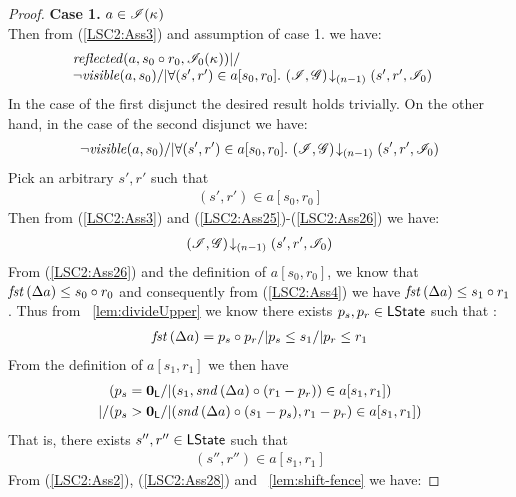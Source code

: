 \begin{lemma}
\begin{proof}
\noindent\textbf{Case 1. } $a \in \mathscr{I}(\kappa_{})$\\
Then from (\ref{LSC2:Ass3}) and assumption of case 1. we have:
%
\begin{align*}
&\begin{array}{l}
	\mathit{reflected}(a, s_0 \circ r_0, \mathscr{I}_0(\kappa_{})) |/ \\
	\neg\mathit{visible}(a, s_0) /| \forall (s', r') \in a[s_0, r_0].\, \left(\mathscr{I}, \mathscr{G}\right) \!\downarrow_{(n-1)} \left(s', r', \mathscr{I}_0\right)
\end{array}
\end{align*}
%
In the case of the first disjunct the desired result holds trivially. On the other hand, in the case of the second disjunct we have:
%
\begin{align}
	\neg\mathit{visible}(a, s_0) /| \forall (s', r') \in a[s_0, r_0].\, \left(\mathscr{I}, \mathscr{G}\right) \!\downarrow_{(n-1)} \left(s', r', \mathscr{I}_0\right) \label{LSC2:Ass17}
\end{align}
%
Pick an arbitrary $s', r'$ such that 
%
\begin{align}
	(s', r') \in a[s_0, r_0]
	\label{LSC2:Ass26}
\end{align}
Then from (\ref{LSC2:Ass3}) and (\ref{LSC2:Ass25})-(\ref{LSC2:Ass26}) we have:
%
\begin{align}
	\left(\mathscr{I}, \mathscr{G}\right) \!\downarrow_{(n-1)} \left(s', r', \mathscr{I}_0\right) \label{LSC2:Ass27}
\end{align}
%
From (\ref{LSC2:Ass26}) and the definition of $a[s_0, r_0]$, we know that $\mathit{fst}\left(\Delta {a}\right) \leq s_0 \circ r_0$ and consequently from (\ref{LSC2:Ass4}) we have $\mathit{fst}\left(\Delta {a}\right) \leq s_1 \circ r_1$. Thus from \lem~\ref{lem:divideUpper} we know there exists $p_s, p_r \in \textsf{LState}$ such that : 
%
\begin{align*}
	\mathit{fst}\left(\Delta {a}\right) = p_s \circ p_r /| p_s \leq s_1 /| p_r \leq r_1
\end{align*}
%
From the definition of $a[s_1, r_1]$ we then have
%
\begin{align*}
	& (p_s = \mathbf{0}_{\textsf{L}} /| (s_1, \mathit{snd}\left(\Delta {a}\right) \circ (r_1 -p_r)) \in a[s_1, r_1])\\
	|/ & (p_s > \mathbf{0}_{\textsf{L}} /| (\mathit{snd}\left(\Delta {a}\right) \circ (s_1 - p_s), r_1 - p_r) \in a[s_1, r_1]) 
\end{align*}
%
That is, there exists $s'', r'' \in \textsf{LState}$ such that
%
\begin{align}
	(s'', r'') \in a[s_1, r_1]
	\label{LSC2:Ass28}
\end{align}
%
From (\ref{LSC2:Ass2}), (\ref{LSC2:Ass28}) and \lem~\ref{lem:shift-fence} we have:

\end{proof}
\end{lemma}

